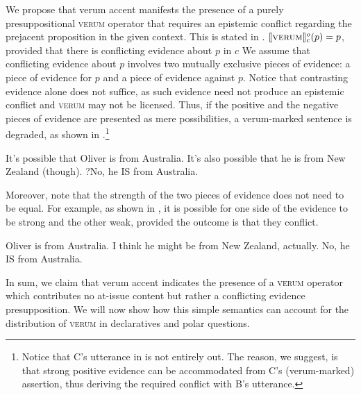 \documentclass[output=paper,colorlinks,citecolor=brown]{langscibook}
\begin{document}
We propose that verum accent manifests the presence of a purely presuppositional \textsc{verum} operator that requires an epistemic conflict regarding the prejacent proposition in the given context. This is stated in .   
\is{}
\ea $\llbracket\textsc{verum}\rrbracket _c^o (p) = p$,  provided that there is conflicting evidence about $p$ in $c$\label{Vrm.Analys}
\z
\il{}
We assume that conflicting evidence about $p$ involves two mutually exclusive pieces of evidence: a piece of evidence for $p$ and a piece of evidence against $p$. Notice that contrasting evidence alone does not suffice, as such evidence need not produce an epistemic conflict and \textsc{verum} may not be licensed. Thus, if the positive and the negative pieces of evidence are presented as mere possibilities, a verum-marked sentence is degraded, as shown in .\footnote{Notice that C's utterance in  is not entirely out. The reason, we suggest, is that strong positive evidence can be accommodated from C's (verum-marked) assertion, thus deriving the required conflict with B's utterance.}
\is{}	
\ea\label{Confl.Ev.Weak}
    \begin{xlist}
	 It's possible that Oliver is from Australia. 
	 It's also possible that he is from New Zealand (though).
	 ?No, he IS from Australia.
	\end{xlist}
\z
\il{}
Moreover, note that the strength of the two pieces of evidence does not need to be equal. For example, as shown in , it is possible for one side of the evidence to be strong and the other weak, provided the outcome is that they conflict.  
\is{}
\ea\label{Confl.Ev.Unbal}
    \begin{xlist}
         Oliver is from Australia. 
         I think he might be from New Zealand, actually.
         No, he IS from Australia. 
    \end{xlist}
\z
\il{}
In sum, we claim that verum accent indicates the presence of a \textsc{verum} operator which contributes no at-issue content but rather a conflicting evidence presupposition. We will now show how this simple semantics can account for the distribution of \textsc{verum} in declaratives and polar questions. 
\end{document}
